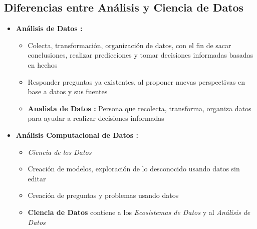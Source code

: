 \subsection{Diferencias entre Análisis y Ciencia de Datos}
\begin{itemize}
    \item {\textbf{Análisis de Datos : }
    \begin{itemize}
        \item {Colecta, transformación, organización de datos, con el fin de sacar conclusiones, realizar predicciones y tomar decisiones informadas basadas en hechos}
        \item {Responder preguntas ya existentes, al proponer nuevas perspectivas en base a datos y sus fuentes}
        \item {\textbf{Analista de Datos : }Persona que recolecta, transforma, organiza datos para ayudar a realizar decisiones informadas}
    \end{itemize}}
    \item {\textbf{Análisis Computacional de Datos : }
    \begin{itemize}
        \item {\textit{Ciencia de los Datos }}
        \item {Creación de modelos, exploración de lo desconocido usando datos sin editar}
        \item {Creación de preguntas y problemas usando datos}
        \item {\textbf{Ciencia de Datos} contiene a los \textit{Ecosistemas de Datos} y al \textit{Análisis de Datos}}
    \end{itemize}}
\end{itemize}

\newpage